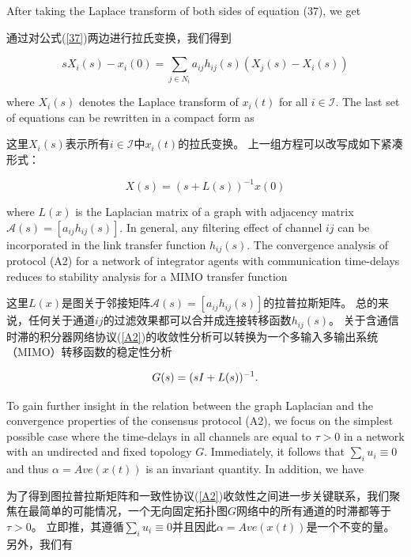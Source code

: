 \documentclass{article}
\begin{document}
{\color[gray]{0.5}
\noindent After taking the Laplace transform of both sides of equation (37), we get 
}

\noindent 通过对公式(\ref{37})两边进行拉氏变换，我们得到

\begin{equation}
    sX_i(s) - x_i(0) = \sum_{j\in N_i} a_{ij} h_{ij}(s) (X_j(s) - X_i(s))
    \tag{38}
    \label{38}
\end{equation}

{\color[gray]{0.5}
\noindent where $X_i(s)$ denotes the Laplace transform of $x_i(t)$ for all $i\in \mathcal{I}$. 
The last set of equations can be rewritten in a compact form as
}

\noindent 这里$X_i(s)$表示所有$i\in \mathcal{I}$中$x_i(t)$的拉氏变换。
上一组方程可以改写成如下紧凑形式：

\begin{equation}
    X(s) = (s+L(s))^{-1}x(0)
    \tag{39}
    \label{39}
\end{equation}

{\color[gray]{0.5}
\noindent where $L(x)$ is the Laplacian matrix of a graph with adjacency matrix $\mathcal{A}(s) = [a_{ij}h_{ij}(s)]$. 
In general, any filtering effect of channel $ij$ can be incorporated in the link transfer function $h_{ij}(s)$. 
The convergence analysis of protocol (A2) for a network of integrator agents with communication time-delays reduces to stability analysis for a MIMO transfer function 
}

\noindent 这里$L(x)$是图关于邻接矩阵$\mathcal{A}(s) = [a_{ij}h_{ij}(s)]$的拉普拉斯矩阵。
总的来说，任何关于通道$ij$的过滤效果都可以合并成连接转移函数$h_{ij}(s)$。
关于含通信时滞的积分器网络协议(\ref{A2})的收敛性分析可以转换为一个多输入多输出系统（MIMO）转移函数的稳定性分析

\begin{equation}
    G(s) = (sI+L(s))^{-1}.
    \notag
\end{equation}

{\color[gray]{0.5}
\noindent To gain further insight in the relation between the graph Laplacian and the convergence properties of the consensus protocol (A2), we focus on the simplest possible case where the time-delays in all channels are equal to $\tau>0$ in a network with an undirected and fixed topology $G$. 
Immediately, it follows that $\sum_i u_i \equiv 0$ and thus $\alpha = Ave(x(t))$ is an invariant quantity. 
In addition, we have
}

\noindent 为了得到图拉普拉斯矩阵和一致性协议(\ref{A2})收敛性之间进一步关键联系，我们聚焦在最简单的可能情况，一个无向固定拓扑图$G$网络中的所有通道的时滞都等于$\tau > 0$。
立即推，其遵循$\sum_i u_i \equiv 0$并且因此$\alpha = Ave(x(t))$是一个不变的量。
另外，我们有
\end{document}
